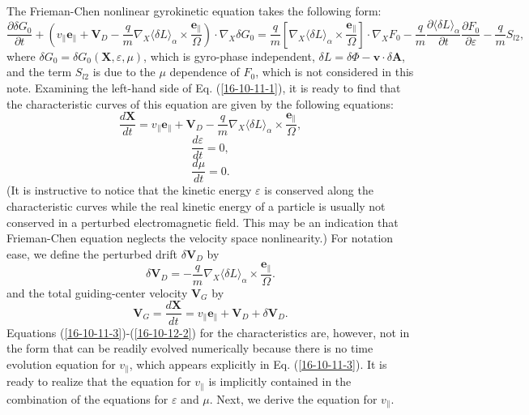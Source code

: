 \documentclass{article}
\begin{document}
The Frieman-Chen nonlinear gyrokinetic equation takes the following form:
\begin{equation}
  \label{16-10-11-1} \frac{\partial \delta G_0}{\partial t} + \left(
  v_{\parallel} \mathbf{e}_{\parallel} +\mathbf{V}_D - \frac{q}{m} \nabla_X
  \langle \delta L \rangle_{\alpha} \times
  \frac{\mathbf{e}_{\parallel}}{\Omega} \right) \cdot \nabla_X \delta G_0 =
  \frac{q}{m} \left[ \nabla_X \langle \delta L \rangle_{\alpha} \times
  \frac{\mathbf{e}_{\parallel}}{\Omega} \right] \cdot \nabla_X F_0 -
  \frac{q}{m} \frac{\partial \langle \delta L \rangle_{\alpha}}{\partial t}
  \frac{\partial F_0}{\partial \varepsilon} - \frac{q}{m} S_{l 2},
\end{equation}
where $\delta G_0 = \delta G_0 (\mathbf{X}, \varepsilon, \mu)$, which is
gyro-phase independent, $\delta L = \delta \Phi -\mathbf{v} \cdot \delta
\mathbf{A}$, and the term $S_{l 2}$ is due to the $\mu$ dependence of $F_0$,
which is not considered in this note. Examining the left-hand side of Eq.
(\ref{16-10-11-1}), it is ready to find that the characteristic curves of this
equation are given by the following equations:
\begin{equation}
  \label{16-10-11-3} \frac{d\mathbf{X}}{d t} = v_{\parallel}
  \mathbf{e}_{\parallel} +\mathbf{V}_D - \frac{q}{m} \nabla_X \langle \delta L
  \rangle_{\alpha} \times \frac{\mathbf{e}_{\parallel}}{\Omega},
\end{equation}
\begin{equation}
  \label{16-10-12-1} \frac{d \varepsilon}{d t} = 0,
\end{equation}
\begin{equation}
  \label{16-10-12-2} \frac{d \mu}{d t} = 0.
\end{equation}
(It is instructive to notice that the kinetic energy $\varepsilon$ is
conserved along the characteristic curves while the real kinetic energy of a
particle is usually not conserved in a perturbed electromagnetic field. This
may be an indication that Frieman-Chen equation neglects the velocity space
nonlinearity.) For notation ease, we define the perturbed drift $\delta
\mathbf{V}_D$ by
\begin{equation}
  \label{19-1-3-1} \delta \mathbf{V}_D = - \frac{q}{m} \nabla_X \langle \delta
  L \rangle_{\alpha} \times \frac{\mathbf{e}_{\parallel}}{\Omega} .
\end{equation}
and the total guiding-center velocity $\mathbf{V}_G$ by
\begin{equation}
  \mathbf{V}_G = \frac{d\mathbf{X}}{d t} = v_{\parallel}
  \mathbf{e}_{\parallel} +\mathbf{V}_D + \delta \mathbf{V}_D .
\end{equation}
Equations (\ref{16-10-11-3})-(\ref{16-10-12-2}) for the characteristics are,
however, not in the form that can be readily evolved numerically because there
is no time evolution equation for $v_{\parallel}$, which appears explicitly in
Eq. (\ref{16-10-11-3}). It is ready to realize that the equation for
$v_{\parallel}$ is implicitly contained in the combination of the equations
for $\varepsilon$ and $\mu$. Next, we derive the equation for $v_{\parallel}$.
\end{document}
